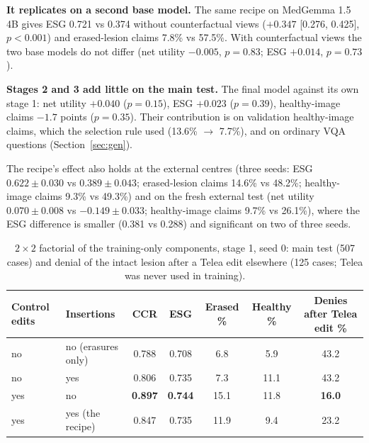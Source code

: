 \documentclass[11pt]{article}
\newcommand{\best}[1]{\textbf{#1}}
\begin{document}
\textbf{It replicates on a second base model.} The same recipe on MedGemma 1.5 4B gives ESG 0.721 vs 0.374 without counterfactual views ($+0.347$ [0.276, 0.425], $p<0.001$) and erased-lesion claims 7.8\% vs 57.5\%. With counterfactual views the two base models do not differ (net utility $-0.005$, $p=0.83$; ESG $+0.014$, $p=0.73$).

\textbf{Stages 2 and 3 add little on the main test.} The final model against its own stage 1: net utility $+0.040$ ($p=0.15$), ESG $+0.023$ ($p=0.39$), healthy-image claims $-1.7$ points ($p=0.35$). Their contribution is on validation healthy-image claims, which the selection rule used (13.6\% $\to$ 7.7\%), and on ordinary VQA questions (Section~\ref{sec:gen}).

The recipe's effect also holds at the external centres (three seeds: ESG $0.622\pm0.030$ vs $0.389\pm0.043$; erased-lesion claims 14.6\% vs 48.2\%; healthy-image claims 9.3\% vs 49.3\%) and on the fresh external test (net utility $0.070\pm0.008$ vs $-0.149\pm0.033$; healthy-image claims 9.7\% vs 26.1\%), where the ESG difference is smaller (0.381 vs 0.288) and significant on two of three seeds.

\begin{table}[t]
\centering\footnotesize\setlength{\tabcolsep}{4pt}
\caption{$2\times2$ factorial of the training-only components, stage 1, seed 0: main test (507 cases) and denial of the intact lesion after a Telea edit elsewhere (125 cases; Telea was never used in training).}
\label{tab:factorial}
\begin{tabular}{llccccc}
\toprule
Control edits & Insertions & CCR & ESG & Erased \% & Healthy \% & Denies after Telea edit \% \\
\midrule
no & no (erasures only) & 0.788 & 0.708 & 6.8 & 5.9 & 43.2 \\
no & yes & 0.806 & 0.735 & 7.3 & 11.1 & 43.2 \\
yes & no & \best{0.897} & \best{0.744} & 15.1 & 11.8 & \best{16.0} \\
yes & yes (the recipe) & 0.847 & 0.735 & 11.9 & 9.4 & 23.2 \\
\bottomrule
\end{tabular}
\end{table}
\end{document}
